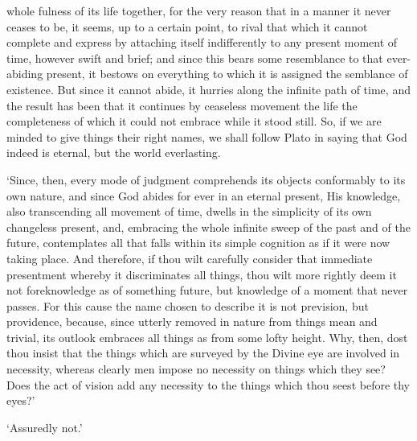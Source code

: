 \documentclass[12pt]{book}
\begin{document}
whole fulness of its life together, for the very reason that in a manner
it never ceases to be, it seems, up to a certain point, to rival that
which it cannot complete and express by attaching itself indifferently
to any present moment of time, however swift and brief; and since this
bears some resemblance to that ever-abiding present, it bestows on
everything to which it is assigned the semblance of existence. But since
it cannot abide, it hurries along the infinite path of time, and the
result has been that it continues by ceaseless movement the life the
completeness of which it could not embrace while it stood still. So, if
we are minded to give things their right names, we shall follow Plato in
saying that God indeed is eternal, but the world everlasting.

`Since, then, every mode of judgment comprehends its objects conformably
to its own nature, and since God abides for ever in an eternal present,
His knowledge, also transcending all movement of time, dwells in the
simplicity of its own changeless present, and, embracing the whole
infinite sweep of the past and of the future, contemplates all that
falls within its simple cognition as if it were now taking place. And
therefore, if thou wilt carefully consider that immediate presentment
whereby it discriminates all things, thou wilt more rightly deem it not
foreknowledge as of something future, but knowledge of a moment that
never passes. For this cause the name chosen to describe it is not
prevision, but providence, because, since utterly removed in nature from
things mean and trivial, its outlook embraces all things as from some
lofty height. Why, then, dost thou insist that the things which are
surveyed by the Divine eye are involved in necessity, whereas clearly
men impose no necessity on things which they see? Does the act of vision
add any necessity to the things which thou seest before thy eyes?'

`Assuredly not.'
\end{document}
